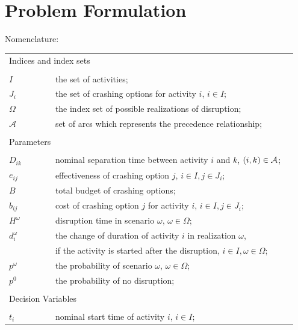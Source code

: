 \documentclass[11pt]{article}
\newcommand{\cA}{{\cal A}}
\begin{document}
\section{Problem Formulation} \label{sec:formulation}
	Nomenclature:
	\begin{longtable}[H]{ l l l l }
		\multicolumn{4}{l}{Indices and index sets} \\
		\\
		\(I\) & \(\qquad\) & the set of activities;&\\
		\(J_i\) & \(\qquad\) & the set of crashing options for activity \(i\), \(i \in I\);&\\
		\(\Omega\) & \(\qquad\) & the index set of possible realizations of disruption;&\\
		\(\mathcal{A}\) &\(\qquad\) & set of arcs which represents the precedence relationship;&\\
		\\
		\multicolumn{4}{l}{Parameters} \\
		\\
		\(D_{ik}\)& \(\qquad\) & nominal separation time between activity \(i\) and \(k\), \((i,k) \in \cA\);&\\
		\(e_{ij}\) & \(\qquad\) & effectiveness of crashing option \(j\), \(i \in I, j \in J_i\);&\\
		\(B\) & \(\qquad\) & total budget of crashing options;&\\
		\(b_{ij}\) & \(\qquad\) & cost of crashing option \(j\) for activity \(i\), \(i \in I, j \in J_i\);&\\
		\(H^\omega\) &\(\qquad\) & disruption time in scenario \(\omega\), \(\omega \in \Omega\);&\\
		\(d_{i}^\omega\) & \(\qquad\)&the change of duration of activity \(i\) in realization \(\omega\), &\\
		& \(\qquad\) & if the activity is started after the disruption, \(i \in I, \omega \in \Omega\);& \\
		\(p^\omega\) & \(\qquad\) & the probability of scenario \(\omega\), \(\omega \in \Omega\);& \\
		\(p^0\) & \(\qquad\) & the probability of no disruption;& \\
		\\
		\multicolumn{4}{l}{Decision Variables}\\
		\\
		\(t_{i}\) & \(\qquad\) & nominal start time of activity \(i\), \(i \in I\);&\\

\end{longtable}
\end{document}
